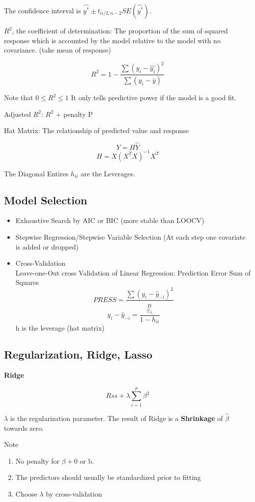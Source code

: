 \documentclass[11pt, openany]{book}              %
\begin{document}
The confidence interval is $\hat{y^*} \pm t_{\alpha/2, n-2} SE(\hat{y^*})$. 

$R^2$, the coefficient of determination: The proportion of the sum of squared response which is accounted by the model relative to the model with no covariance. (take mean of response)

$$R^2 = 1- \frac{\sum(y_i-\hat{y_i})^2}{\sum(y_i-\bar{y})}$$

Note that $0 \leq R^2 \leq 1$ It only tells predictive power if the model is a good fit.

Adjusted $R^2$: $R^2$ + penalty P

Hat Matrix: The relationship of predicted value and response

$$Y = H\hat{Y}$$
$$H = X(X^TX)^{-1}X^T$$

The Diagonal Entires $h_{ii}$ are the Leverages. 

\subsection{Model Selection}

\begin{itemize}
    \item Exhaustive Search by AIC or BIC (more stable than LOOCV)
    \item Stepwise Regression/Stepwise Variable Selection (At each step one covariate is added or dropped)
    \item Cross-Validation 
    \\ Leave-one-Out cross Validation of Linear Regression: Prediction Error Sum of Squares 
    $$PRESS = \frac{\sum(y_i-\hat{y}_{-i})^2}{n}$$
    $$y_i-\hat{y}_{-i} = \frac{\hat{\varepsilon}_i}{1-h_{ii}}$$ h is the leverage (hat matrix)
\end{itemize}

\subsection{Regularization, Ridge, Lasso}

\textbf{Ridge}

$$Rss + \lambda \sum_{i=1}^p \beta^2$$

$\lambda$ is the regularization parameter. The result of Ridge is a \textbf{Shrinkage} of $\hat{\beta}$ towards zero.

Note
\begin{enumerate}
	\item No penalty for $\beta+0$ or b.
	\item The predictors should usually be standardized prior to fitting
	\item Choose $\lambda$ by cross-validation
\end{enumerate}
\end{document}
